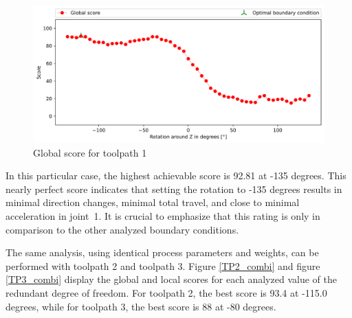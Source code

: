 \begin{figure}[H]
	\centerline{\includegraphics[width=1\textwidth]{figures/best_c_1.png}}
	\caption{Global score for toolpath 1}
	\label{GS1}
\end{figure}
In this particular case, the highest achievable score is 92.81 at -135 degrees. This nearly perfect score indicates that setting the rotation to -135 degrees results in minimal direction changes, minimal total travel, and close to minimal acceleration in joint~1. It is crucial to emphasize that this rating is only in comparison to the other analyzed boundary conditions.


The same analysis, using identical process parameters and weights, can be performed with toolpath 2 and toolpath 3. Figure \ref{TP2_combi} and figure \ref{TP3_combi} display the global and local scores for each analyzed value of the redundant degree of freedom. For toolpath 2, the best score is 93.4 at -115.0 degrees, while for toolpath 3, the best score is 88 at -80 degrees.

